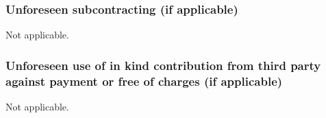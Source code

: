 \subsubsection{Unforeseen subcontracting (if applicable)}

Not applicable.

\subsubsection{Unforeseen use of in kind contribution from third party against payment or
  free of charges (if applicable)}

 Not applicable. 
